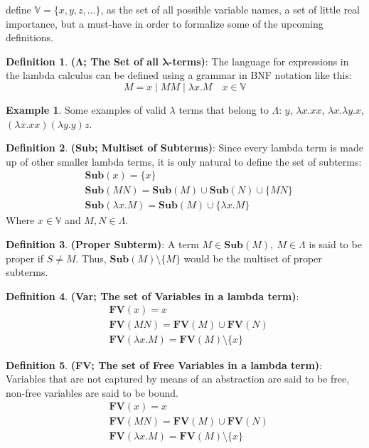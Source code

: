 \documentclass[12pt]{book}
\newcommand{\functionfont}[1]{\mathbf{#1}}
\newcommand{\Sub}[1]{\functionfont {Sub}(#1)}
\newcommand{\FV}[1]{\functionfont {FV}(#1)}
\theoremstyle{plain}
\theoremstyle{definition}
\newtheorem{definition}{Definition}[section]
\theoremstyle{definition}
\newtheorem{example}{Example}[section]
\theoremstyle{remark}
\begin{document}
define $\mathbb{V} = \{x, y, z, ...\}$, as the set of all possible variable names, a set of little real importance, but a must-have in order to formalize some of the upcoming definitions.
\begin{definition} \textbf{($\mathbf{\Lambda}$; The Set of all $\mathbf{\lambda}$-terms)}: The language for expressions in the lambda calculus can be defined using a grammar in BNF notation like this:
  \label{def:lambda-terms}
  \[
    M = x \mid MM \mid \lambda x . M \quad x \in \mathbb{V}
  \]
\end{definition}
\begin{example} Some examples of valid $\lambda$ terms that belong to $\Lambda$:
  \( y \),
  \( \lambda x. x x \),
  \( \lambda x. \lambda y. x \),
  \( (\lambda x. x x) (\lambda y. y) z \).
\end{example}
\begin{definition} \textbf{(Sub; Multiset of Subterms)}: Since every lambda term is made up of other smaller lambda terms, it is only natural to define the set of subterms:
\begin{align*}
  &\Sub x = \{x\} \\
  &\Sub {MN} = \Sub M  \cup \Sub N \cup \{MN\} \\
  &\Sub {\lambda x . M} = \Sub M  \cup \{\lambda x. M\}
\end{align*}
Where $x \in \mathbb{V}$ and $M, N \in \Lambda $.
\end{definition}
\begin{definition} \textbf{(Proper Subterm)}: A term $M \in \Sub M, \ M \in \Lambda$ is said to be proper if $S \neq M$. Thus, $\Sub{M} \setminus \{M\}$ would be the multiset of proper subterms.
\end{definition}
\begin{definition} \textbf{(Var; The set of Variables in a lambda term)}:
\begin{align*}
    & \FV x = {x}\\
    & \FV {MN} = \FV M \cup \FV {N} \\
    & \FV {\lambda x . M} = \FV M \setminus \{x\}
\end{align*}
\end{definition}
\begin{definition} \textbf{(FV; The set of Free Variables in a lambda term)}: Variables that are not captured by means of an abstraction are said to be free, non-free variables are said to be bound.
\begin{align*}
    & \FV x = {x}\\
    & \FV {MN} = \FV M \cup \FV {N} \\
    & \FV {\lambda x . M} = \FV M \setminus \{x\}
\end{align*}
\end{definition}
\end{document}
